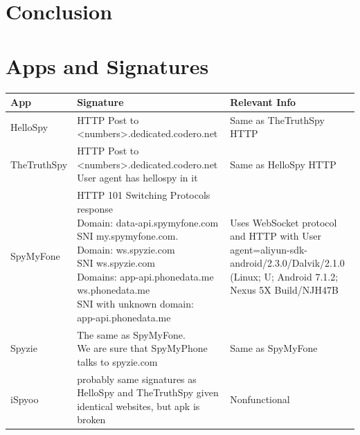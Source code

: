 \documentclass[acmtog]{acmart}
\begin{document}
\section{Conclusion}




\appendix

\section{Apps and Signatures}
\begin{table}
\begin{tabular}{p{5cm}p{5cm}p{5cm}}
	\toprule
	App & Signature & Relevant Info \\
	\midrule
	HelloSpy & \makecell{HTTP Post to\\ <numbers>.dedicated.codero.net} & Same as TheTruthSpy HTTP \\
	
	TheTruthSpy & \makecell{HTTP Post to\\ <numbers>.dedicated.codero.net\\ User agent has hellospy in it} & Same as HelloSpy HTTP \\
	
	SpyMyFone & \makecell{HTTP 101 Switching Protocols response\\
	Domain: data-api.spymyfone.com\\SNI my.spymyfone.com.\\
	Domain: ws.spyzie.com\\SNI ws.spyzie.com\\
	Domains: app-api.phonedata.me\\ws.phonedata.me\\
	SNI with unknown domain:\\ app-api.phonedata.me} & Uses WebSocket protocol and HTTP with User agent=aliyun-sdk-android/2.3.0/Dalvik/2.1.0 (Linux; U; Android 7.1.2; Nexus 5X Build/NJH47B \\

	Spyzie & \makecell{The same as SpyMyFone.\\ We are sure that SpyMyPhone\\ talks to spyzie.com} & Same as SpyMyFone \\
	
	iSpyoo & probably same signatures as HelloSpy and TheTruthSpy given identical websites, but apk is broken & Nonfunctional \\
	

\end{tabular}
\end{table}
\end{document}
